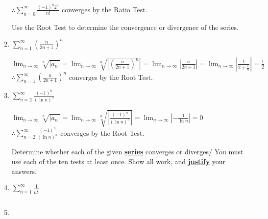 \documentclass[10pt,letterpaper]{report}
\begin{document}
\begin{enumerate}
    $\therefore \sum_{n=0}^{\infty}{\frac{(-1)^{n}2^{n}}{n!}}$ converges by the Ratio Test. \\

    \hline


\noindent Use the Root Test to determine the convergence or divergence of the series. \\

  \item{$\sum_{n=1}^{\infty}{\left(\frac{n}{2n+1}\right)^n}$ \\}

    $\lim_{n\to\infty}{\sqrt[n]{\left|a_{n}\right|}}=
    \lim_{n\to\infty}{\sqrt[n]{\left|\left(\frac{n}{2n+1}\right)^n\right|}}=
    \lim_{n\to\infty}{\left|\frac{n}{2n+1}\right|}=
    \lim_{n\to\infty}{\left|\frac{1}{2+\frac{1}{n}}\right|}=\frac{1}{2}$ \\

    $\therefore \sum_{n=1}^{\infty}{\left(\frac{n}{2n+1}\right)^n}$ converges by the Root Test. \\

  \item{$\sum_{n=2}^{\infty}{\frac{(-1)^{n}}{(\ln{n})^{n}}}$ \\}

    $\lim_{n\to\infty}{\sqrt[n]{\left|a_{n}\right|}}=
    \lim_{n\to\infty}{\sqrt[n]{\left|\frac{(-1)^{n}}{(\ln{n})^{n}}\right|}}=
    \lim_{n\to\infty}{\left|-\frac{1}{\ln{n}}\right|}=0$ \\

    $\therefore \sum_{n=2}^{\infty}{\frac{(-1)^{n}}{(\ln{n})^{n}}}$ converges by the Root Test. \\

    \pagebreak

\noindent Determine whether each of the given \textbf{\underline{series}} converges or diverges/ You must use each of the ten tests at least once. Show all work, and \textbf{\underline{justify}} your answers. \\

  \item{$\sum_{n=1}^{\infty}{\frac{1}{n^{\frac{3}{2}}}}$ \\}

    $ $ \\

  \item{}

\end{enumerate}
\end{document}
